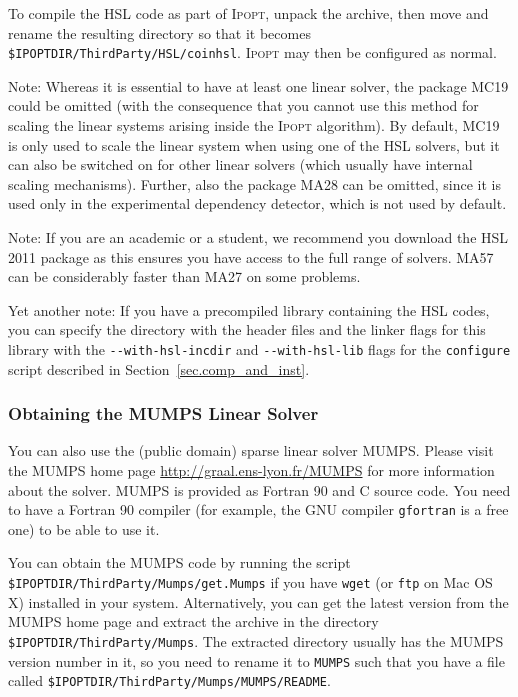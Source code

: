 \documentclass[10pt]{article}
\newcommand{\Ipopt}{\textsc{Ipopt}\xspace}
\begin{document}
To compile the HSL code as part of \Ipopt, unpack the archive, then move and
rename the resulting directory so that it becomes
{\tt \$IPOPTDIR/ThirdParty/HSL/coinhsl}. \Ipopt may then be configured as
normal.

Note: Whereas it is essential to have at least one linear solver, the
package MC19 could be omitted (with the consequence that you cannot
use this method for scaling the linear systems arising inside the
\Ipopt algorithm).  By default, MC19 is only used to scale the linear
system when using one of the HSL solvers, but it can also be
switched on for other linear solvers (which usually have internal
scaling mechanisms).
Further, also the package MA28 can be omitted, since it is used only
in the experimental dependency detector, which is not used by default.

Note: If you are an academic or a student, we recommend you download the
HSL 2011 package as this ensures you have access to the full range of solvers.
MA57 can be considerably faster than MA27 on some problems.

Yet another note: If you have a precompiled library containing the
HSL codes, you can specify the directory with the header files and
the linker flags for this library with the \verb|--with-hsl-incdir| and
\verb|--with-hsl-lib| flags for the {\tt configure} script described in
Section~\ref{sec.comp_and_inst}.

\subsubsection{Obtaining the MUMPS Linear Solver}\label{sec:MUMPS}

You can also use the (public domain) sparse linear solver MUMPS.
Please visit the MUMPS home page \url{http://graal.ens-lyon.fr/MUMPS}
for more information about the solver. MUMPS is provided as Fortran 90
and C source code.  You need to have a Fortran 90 compiler (for
example, the GNU compiler {\tt gfortran} is a free one) to be able to
use it.

You can obtain the MUMPS code by running the script
{\tt \$IPOPTDIR/ThirdParty/Mumps/get.Mumps} if you have {\tt wget} 
(or {\tt ftp} on Mac OS X) installed in your system. 
Alternatively, you can get the latest version
from the MUMPS home page and extract the archive in the
directory {\tt \$IPOPTDIR/ThirdParty/Mumps}.  The extracted
directory usually has the MUMPS version number in it, so you need to
rename it to {\tt MUMPS} such that you have a file called
{\tt \$IPOPTDIR/ThirdParty/Mumps/MUMPS/README}.
\end{document}
